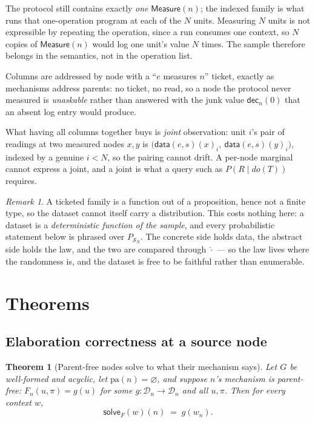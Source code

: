 \documentclass[11pt,a4paper]{article}
\theoremstyle{definition}
\theoremstyle{plain}
\newtheorem{theorem}[definition]{Theorem}
\theoremstyle{remark}
\newtheorem{remark}[definition]{Remark}
\newcommand{\pa}{\mathrm{pa}}
\newcommand{\dom}{\mathcal{D}}
\newcommand{\solve}{\mathsf{solve}}
\newcommand{\dect}{\mathsf{dec}}
\newcommand{\Smp}{\mathcal{S}}         %
\newcommand{\emp}[1]{\widehat{#1}}
\begin{document}
The protocol still contains exactly \emph{one} $\mathsf{Measure}(n)$; the
indexed family is what runs that one-operation program at each of the $N$
units. Measuring $N$ units is not expressible by repeating the operation,
since a run consumes one context, so $N$ copies of $\mathsf{Measure}(n)$
would log one unit's value $N$ times. The sample therefore belongs in the
semantics, not in the operation list.

Columns are addressed by node with a ``$e$ measures $n$'' ticket, exactly
as mechanisms address parents: no ticket, no read, so a node the protocol
never measured is \emph{unaskable} rather than answered with the junk value
$\dect_n(0)$ that an absent log entry would produce.

What having all columns together buys is \emph{joint} observation: unit
$i$'s pair of readings at two measured nodes $x,y$ is
$\bigl(\mathsf{data}(e,s)(x)_i,\ \mathsf{data}(e,s)(y)_i\bigr)$, indexed by
a genuine $i < N$, so the pairing cannot drift. A per-node marginal cannot
express a joint, and a joint is what a query such as $P(R \mid do(T))$
requires.

\begin{remark}
A ticketed family is a function out of a proposition, hence not a finite
type, so the dataset cannot itself carry a distribution. This costs
nothing here: a dataset is a \emph{deterministic function of the sample},
and every probabilistic statement below is phrased over $P_{\Smp_N}$. The
concrete side holds data, the abstract side holds the law, and the two are
compared through $\emp{\cdot}$ --- so the law lives where the randomness
is, and the dataset is free to be faithful rather than enumerable.
\end{remark}

\section{Theorems}

\subsection{Elaboration correctness at a source node}

\begin{theorem}[Parent-free nodes solve to what their mechanism says]
\label{thm:solvesource}
Let $G$ be well-formed and acyclic, let $\pa(n) = \varnothing$, and suppose
$n$'s mechanism is \emph{parent-free}: $F_n(u,\pi) = g(u)$ for some
$g : \dom_n \to \dom_n$ and all $u,\pi$. Then for every context $w$,
\[
  \solve_F(w)(n) \;=\; g(w_n).
\]
\end{theorem}
\end{document}
